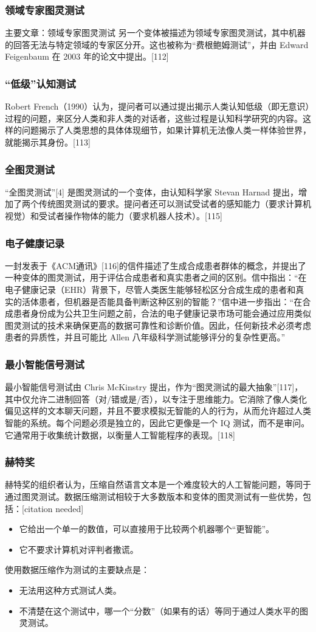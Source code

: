\subsubsection{领域专家图灵测试}
主要文章：领域专家图灵测试  
另一个变体被描述为领域专家图灵测试，其中机器的回答无法与特定领域的专家区分开。这也被称为“费根鲍姆测试”，并由 Edward Feigenbaum 在 2003 年的论文中提出。[112]
\subsubsection{“低级”认知测试}
Robert French（1990）认为，提问者可以通过提出揭示人类认知低级（即无意识）过程的问题，来区分人类和非人类的对话者，这些过程是认知科学研究的内容。这样的问题揭示了人类思想的具体体现细节，如果计算机无法像人类一样体验世界，就能揭示其身份。[113]
\subsubsection{全图灵测试}
“全图灵测试”[4] 是图灵测试的一个变体，由认知科学家 Stevan Harnad 提出，增加了两个传统图灵测试的要求。提问者还可以测试受试者的感知能力（要求计算机视觉）和受试者操作物体的能力（要求机器人技术）。[115]
\subsubsection{电子健康记录}
一封发表于《ACM通讯》[116]的信件描述了生成合成患者群体的概念，并提出了一种变体的图灵测试，用于评估合成患者和真实患者之间的区别。信中指出：“在电子健康记录（EHR）背景下，尽管人类医生能够轻松区分合成生成的患者和真实的活体患者，但机器是否能具备判断这种区别的智能？”信中进一步指出：“在合成患者身份成为公共卫生问题之前，合法的电子健康记录市场可能会通过应用类似图灵测试的技术来确保更高的数据可靠性和诊断价值。因此，任何新技术必须考虑患者的异质性，并且可能比 Allen 八年级科学测试能够评分的复杂性更高。”
\subsubsection{最小智能信号测试}
最小智能信号测试由 Chris McKinstry 提出，作为“图灵测试的最大抽象”[117]，其中仅允许二进制回答（对/错或是/否），以专注于思维能力。它消除了像人类化偏见这样的文本聊天问题，并且不要求模拟无智能的人的行为，从而允许超过人类智能的系统。每个问题必须是独立的，因此它更像是一个 IQ 测试，而不是审问。它通常用于收集统计数据，以衡量人工智能程序的表现。[118]
\subsubsection{赫特奖}
赫特奖的组织者认为，压缩自然语言文本是一个难度较大的人工智能问题，等同于通过图灵测试。数据压缩测试相较于大多数版本和变体的图灵测试有一些优势，包括：[citation needed]
\begin{itemize}
\item 它给出一个单一的数值，可以直接用于比较两个机器哪个“更智能”。
\item 它不要求计算机对评判者撒谎。
\end{itemize}
使用数据压缩作为测试的主要缺点是：
\begin{itemize}
\item 无法用这种方式测试人类。
\item 不清楚在这个测试中，哪一个“分数”（如果有的话）等同于通过人类水平的图灵测试。
\end{itemize}
